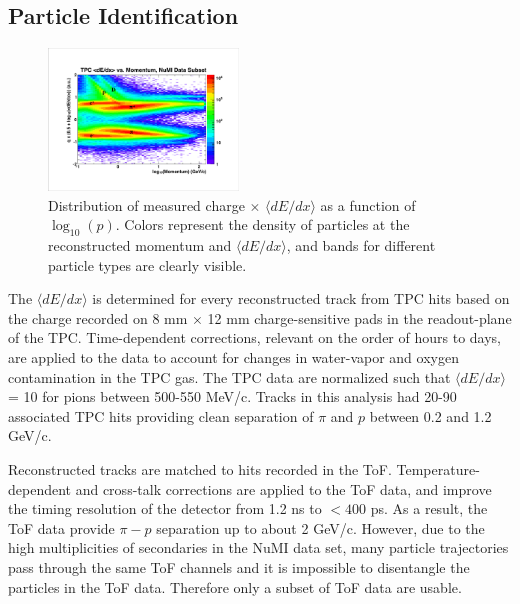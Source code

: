 \documentclass[%
aps, prd, reprint, show pacs, preprint numbers, ams math, amssymb, superscriptaddress, linenumbers]{revtex4-1}
\newcommand{\dedx}{\ensuremath{\langle dE/dx\rangle}\xspace}
\begin{document}
\subsection{Particle Identification}

\begin{figure}[thp]
   \centering
   \includegraphics[width=0.45\textwidth]{NuMITPCdEdx}
   \caption{Distribution of measured charge $\times$ \dedx as a function of $\log_{10}(p)$.  Colors represent the density of particles at the reconstructed momentum and \dedx, and bands for different particle types are clearly visible.}
   \label{fig:dedxVsMom}
\end{figure}

The \dedx is determined for every reconstructed track from TPC hits based on the charge recorded on 8 mm $\times$ 12 mm charge-sensitive pads in the readout-plane of the TPC.  Time-dependent corrections, relevant on the order of hours to days, are applied to the data to account for changes in water-vapor and oxygen contamination in the TPC gas.  The TPC data are normalized such that \dedx = 10 for pions between 500-550 MeV/c.  Tracks in this analysis had 20-90 associated TPC hits providing clean separation of $\pi$ and $p$ between 0.2 and 1.2 GeV/c.  

Reconstructed tracks are matched to hits recorded in the ToF.  Temperature-dependent and cross-talk corrections are applied to the ToF data, and improve the timing resolution of the detector from 1.2 ns to $<400$ ps.  As a result, the ToF data provide $\pi-p$ separation up to about 2 GeV/c.  However, due to the high multiplicities of secondaries in the NuMI data set, many particle trajectories pass through the same ToF channels and it is impossible to disentangle the particles in the ToF data.  Therefore only a subset of ToF data are usable.  

\end{document}
